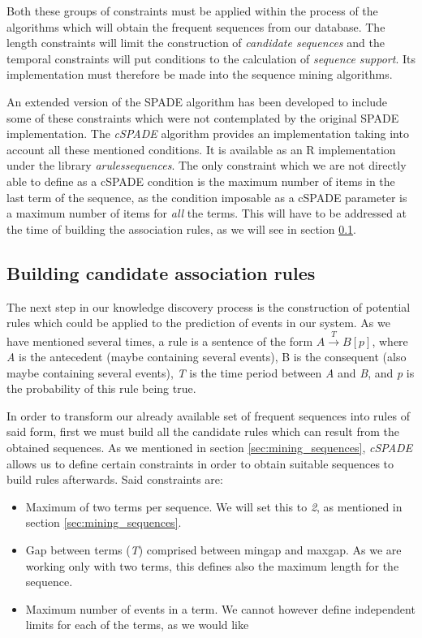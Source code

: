 \documentclass[a4paper,12pt]{article}
\begin{document}
Both these groups of constraints must be applied within the process of the algorithms which will obtain the frequent sequences from our database. The length constraints will limit the construction of \emph{candidate sequences} and the temporal constraints will put conditions to the calculation of \emph{sequence support}. Its implementation must therefore be made into the sequence mining algorithms.

An extended version of the SPADE algorithm has been developed to include some of these constraints which were not contemplated by the original SPADE implementation. The \emph{cSPADE} algorithm\cite{zaki2000cspade,wu2010sequential} provides an implementation taking into account all these mentioned conditions. It is available as an R implementation under the library \emph{arulessequences}\cite{hahsler2011arules}. The only constraint which we are not directly able to define as a cSPADE condition is the maximum number of items in the last term of the sequence, as the condition imposable as a cSPADE parameter is a maximum number of items for \emph{all} the terms. This will have to be addressed at the time of building the association rules, as we will see in section \ref{sec:assoc_rules}.

\subsection{Building candidate association rules} \label{sec:assoc_rules}
The next step in our knowledge discovery process is the construction of potential rules which could be applied to the prediction of events in our system. As we have mentioned several times, a rule is a sentence of the form ${A} \xrightarrow{T} {B} [p]$, where \emph{A} is the antecedent (maybe containing several events), B is the consequent (also maybe containing several events), \emph{T} is the time period between \emph{A} and \emph{B}, and \emph{p} is the probability of this rule being true.

In order to transform our already available set of frequent sequences into rules of said form, first we must build all the candidate rules which can result from the obtained sequences. As we mentioned in section \ref{sec:mining_sequences}, \emph{cSPADE} allows us to define certain constraints in order to obtain suitable sequences to build rules afterwards. Said constraints are:

\begin{itemize}
\item Maximum of two terms per sequence. We will set this to \emph{2}, as mentioned in section \ref{sec:mining_sequences}.
\item Gap between terms (\emph{T}) comprised between mingap and maxgap. As we are working only with two terms, this defines also the maximum length for the sequence.
\item Maximum number of events in a term. We cannot however define independent limits for each of the terms, as we would like
\end{itemize}
\end{document}
